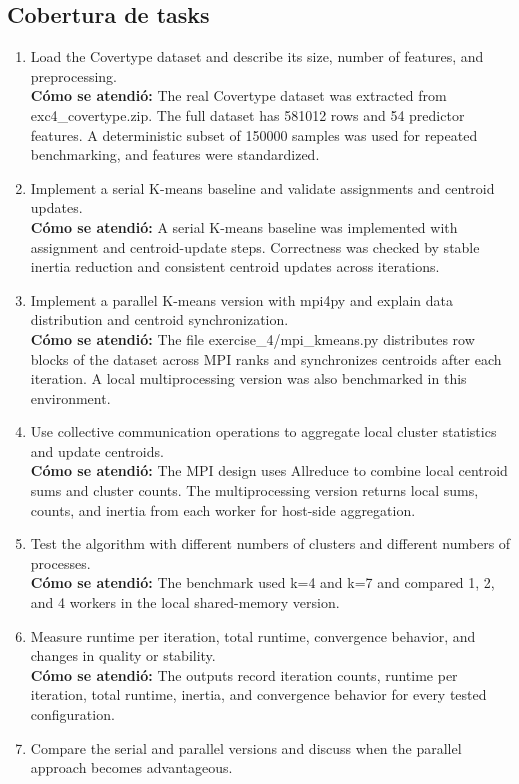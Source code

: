 \documentclass[11pt]{article}
\begin{document}
\subsection*{Cobertura de tasks}
\begin{enumerate}[leftmargin=*]
\item Load the Covertype dataset and describe its size, number of features, and preprocessing.\\
\textbf{Cómo se atendió:} The real Covertype dataset was extracted from exc4\_covertype.zip. The full dataset has 581012 rows and 54 predictor features. A deterministic subset of 150000 samples was used for repeated benchmarking, and features were standardized.
\item Implement a serial K-means baseline and validate assignments and centroid updates.\\
\textbf{Cómo se atendió:} A serial K-means baseline was implemented with assignment and centroid-update steps. Correctness was checked by stable inertia reduction and consistent centroid updates across iterations.
\item Implement a parallel K-means version with mpi4py and explain data distribution and centroid synchronization.\\
\textbf{Cómo se atendió:} The file exercise\_4/mpi\_kmeans.py distributes row blocks of the dataset across MPI ranks and synchronizes centroids after each iteration. A local multiprocessing version was also benchmarked in this environment.
\item Use collective communication operations to aggregate local cluster statistics and update centroids.\\
\textbf{Cómo se atendió:} The MPI design uses Allreduce to combine local centroid sums and cluster counts. The multiprocessing version returns local sums, counts, and inertia from each worker for host-side aggregation.
\item Test the algorithm with different numbers of clusters and different numbers of processes.\\
\textbf{Cómo se atendió:} The benchmark used k=4 and k=7 and compared 1, 2, and 4 workers in the local shared-memory version.
\item Measure runtime per iteration, total runtime, convergence behavior, and changes in quality or stability.\\
\textbf{Cómo se atendió:} The outputs record iteration counts, runtime per iteration, total runtime, inertia, and convergence behavior for every tested configuration.
\item Compare the serial and parallel versions and discuss when the parallel approach becomes advantageous.\\

\end{enumerate}
\end{document}
